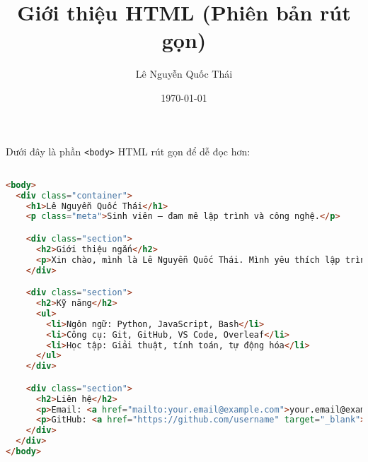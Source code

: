 \documentclass[a4paper,12pt]{article}
\title{Giới thiệu HTML (Phiên bản rút gọn)}
\author{Lê Nguyễn Quốc Thái}
\date{\today}
\begin{document}
\maketitle

Dưới đây là phần \texttt{<body>} HTML rút gọn để dễ đọc hơn:

\begin{lstlisting}[language=HTML]

<body>
  <div class="container">
    <h1>Lê Nguyễn Quốc Thái</h1>
    <p class="meta">Sinh viên — đam mê lập trình và công nghệ.</p>

    <div class="section">
      <h2>Giới thiệu ngắn</h2>
      <p>Xin chào, mình là Lê Nguyễn Quốc Thái. Mình yêu thích lập trình, công nghệ và luôn tìm cách cải thiện kỹ năng qua các dự án thực tế.</p>
    </div>

    <div class="section">
      <h2>Kỹ năng</h2>
      <ul>
        <li>Ngôn ngữ: Python, JavaScript, Bash</li>
        <li>Công cụ: Git, GitHub, VS Code, Overleaf</li>
        <li>Học tập: Giải thuật, tính toán, tự động hóa</li>
      </ul>
    </div>

    <div class="section">
      <h2>Liên hệ</h2>
      <p>Email: <a href="mailto:your.email@example.com">your.email@example.com</a></p>
      <p>GitHub: <a href="https://github.com/username" target="_blank">github.com/username</a></p>
    </div>
  </div>
</body>

\end{lstlisting}
\end{document}
